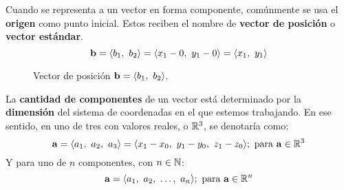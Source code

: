 \documentclass[12pt]{article}
\begin{document}
Cuando se representa a un vector en forma componente, comúnmente se usa el \textbf{origen} como punto inicial. Estos reciben el nombre de \textbf{vector de posición} o \textbf{vector estándar}.
\[
  \mathbf{b} = \langle b_{1}, \ b_{2} \rangle = \langle x_{1} - 0, \ y_{1} - 0 \rangle = \langle x_{1}, \ y_{1} \rangle
\]

\begin{figure}[hbt!]
\centering


\caption{Vector de posición $\mathbf{b} = \langle b_{1}, \ b_{2} \rangle$.}

\end{figure}

La \textbf{cantidad de componentes} de un vector está determinado por la \textbf{dimensión} del sistema de coordenadas en el que estemos trabajando. En ese sentido, en uno de tres con valores reales, o $\mathbb{R}^{3}$, se denotaría como:
\[
  \vecmat{a} = \langle a_{1}, \ a_{2}, \ a_{3} \rangle
             = \langle x_{1} - x_{0}, \ y_{1} - y_{0}, \ z_{1} - z_{0} \rangle;
             \text{ para } \vecmat{a} \in \R^{3}
\]
Y para uno de $n$ componentes, con $n \in \mathbb{N}$:
\[
  \vecmat{a} = \langle a_{1}, \ a_{2}, \ \ldots, \ a_{n} \rangle; \text{ para } \vecmat{a} \in \R^{n}
\]
\end{document}
